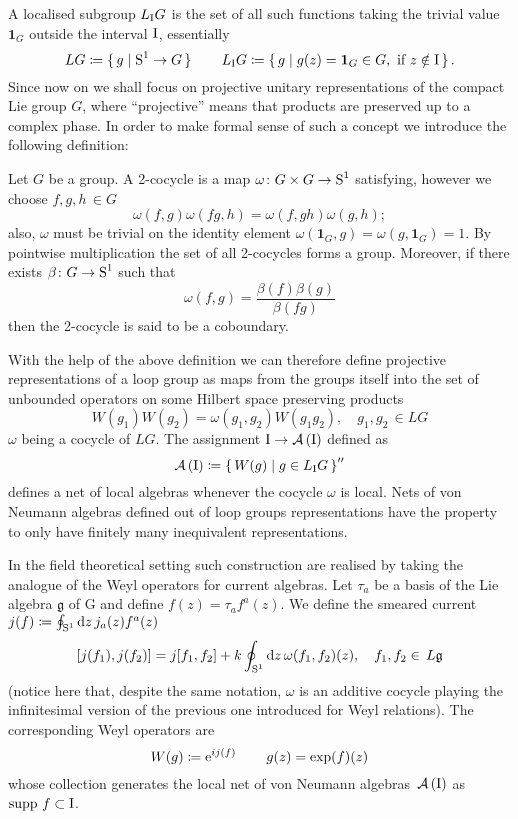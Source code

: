  A localised subgroup $L_{\textrm{I}}G$ is the set of all
 such functions taking the trivial value $\bm{1}_G$ 
 outside the interval $\textrm{I}$, essentially  
 \[
 LG\coloneqq\set{g\mid \textrm{S}^1\to G}\qquad
 L_{\textrm{I}}G\coloneqq \set{g\mid g(z)
 =\bm{1}_G\in G, \text{ if }z\notin\textrm{I}}.
 \]
 Since now on we shall focus on projective unitary 
 representations of the compact Lie group $G$, where 
 ``projective'' means that products are preserved up to a 
 complex phase. In order to make formal sense 
 of such a concept we introduce the following
 definition:
 \begin{definition}[2-cocycle]
 Let $G$ be a group. A 2-cocycle is a map $\omega\colon
 G\times G\to\textrm{S}^1$ satisfying, however we choose $f,g,h\,\in G$
 \[
 \omega(f,g)\omega(fg,h)=\omega(f,gh)\omega(g,h);
 \]
 also, $\omega$ must be trivial on the identity element
 $\omega(\bm{1}_G,g)=\omega(g,\bm{1}_G)=1$. By pointwise
 multiplication the set of all 2-cocycles forms a group. 
 Moreover, if there exists
 $\beta\colon G\to \textrm{S}^1$ such that
 \[
 \omega(f,g)=\frac{\beta(f)\beta(g)}{\beta(fg)}
 \]
 then the 2-cocycle is said to be a coboundary. 
 \end{definition}
 With the help of the above definition we can therefore
 define projective representations of a loop group as
 maps from the groups itself into the set of unbounded
 operators on some Hilbert space preserving products
 \[
 W(g_1)W(g_2)=\omega(g_1,g_2)
 W(g_1 g_2),\quad g_1,g_2\,\in LG
 \]
 $\omega$ being a cocycle of $LG$.
 The assignment $\textrm{I}\to\mathcal{A}\left(\textrm{I}\right)$ defined as
 \[
 \mathcal{A}\left(\textrm{I}\right)\coloneqq\set{W(g)\mid g\in L_{\textrm{I}}G}''
 \]
 defines a net of local algebras whenever the cocycle
 $\omega$ is local. Nets of von Neumann algebras defined
 out of loop groups representations have the property
 to only have finitely many inequivalent representations.
 
 \bigskip
 In the field theoretical setting such construction
 are realised by taking the analogue of the Weyl operators
 for current algebras. Let $\tau_a$ be a basis 
 of the Lie algebra $\mathfrak{g}$ of G and define 
 $f(z)=\tau_a f^a(z)$. We define the smeared current
 $j(f)\coloneqq\oint_{\textrm{S}^1}\textrm{d} z\, j_a(z)f^a(z)$
 \[
 \comm*{j(f_1),j(f_2)}=j\comm*{f_1,f_2} + 
 k\oint_{\s}\dd z\,\omega(f_1,f_2)(z),
 \quad f_1, f_2\in\,L\mathfrak{g}
 \]
 (notice here that, despite the same notation,
 $\omega$ is an additive cocycle playing the infinitesimal
 version of the previous one introduced for Weyl relations).
 The corresponding Weyl operators are
 \[
 W(g)\coloneqq\operatorname{e}^{ij(f)}\qquad g(z)=\exp (f)(z)
 \]
 whose collection generates the local net of von Neumann
 algebras~$\mathcal{A}\left(\textrm{I}\right)$ as $\textrm{supp}\ f\subset \textrm{I}$.
 
